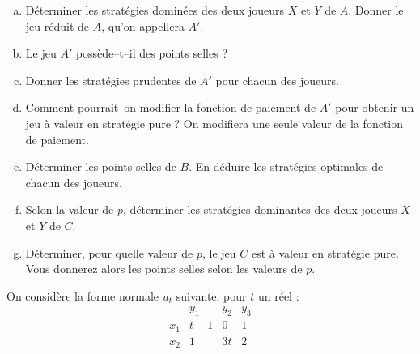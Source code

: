 \documentclass[french,11pt,leqno]{article}
\newcounter{exocount}
\newcounter{questcount}
\def\exo{\bigskip\noindent{\bf Exercice \theexocount {} -}
  \addtocounter{exocount}{1} \setcounter{questcount}{1}}
\begin{document}
\begin{enumerate}[a)]%
\item D\'eterminer les strat\'egies domin\'ees des deux joueurs $X$ et $Y$ de $A$. Donner le jeu r\'eduit de $A$, qu'on appellera $A'$. 
\item Le jeu $A'$ poss\`ede--t--il des points selles ? 
\item Donner les strat\'egies prudentes de $A'$ pour chacun des joueurs.
\item Comment pourrait--on modifier la fonction de paiement de $A'$ pour obtenir un jeu \`a valeur en strat\'egie pure ? On modifiera
        une seule valeur de la fonction de paiement.
\item D\'eterminer les points selles de $B$. En d\'eduire les strat\'egies optimales de chacun des joueurs.
\item Selon la valeur de $p$, d\'eterminer les strat\'egies dominantes des deux joueurs $X$ et $Y$ de $C$.
\item D\'eterminer, pour quelle valeur de $p$, le jeu $C$ est \`a valeur en strat\'egie pure. Vous donnerez alors les points selles selon les valeurs de $p$.
\end{enumerate}



\exo 
On consid\`ere la forme normale $u_t$ suivante, pour $t$ un r\'eel :
\begin{equation*}
%
\begin{array}{l|rrr}
    & y_1 & y_2 & y_3  \\ \hline
x_1 & t-1&0 & 1\\
x_2 & 1&3t & 2\\

\end{array}
%
%
\end{equation*}
\end{document}
